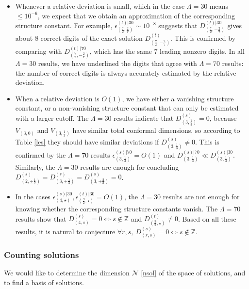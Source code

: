 \documentclass[12pt, a4paper]{article}
\begin{document}
\begin{itemize}
 \item
 Whenever a relative deviation is small, which in the case $\Lambda=30$ means $\leq 10^{-6}$, we expect that we obtain an approximation of the corresponding structure constant. For example, $\epsilon_{(\frac72,\frac27)}^{(t)|30}\sim 10^{-8}$ suggests that $D_{(\frac72,-\frac27)}^{(t)|30}$ gives about $8$ correct digits of the exact solution $D_{(\frac72,-\frac27)}^{(t)}$. This is confirmed by comparing with $D_{(\frac72,-\frac27)}^{(t)|70}$, which has the same $7$ leading nonzero digits. In all $\Lambda = 30$ results, we have underlined the digits that agree with $\Lambda = 70$ results: the number of correct digits is always accurately estimated by the relative deviation. 
 \item
 When a relative deviation is $O(1)$, we have either a vanishing structure constant, or a non-vanishing structure constant that can only be estimated with a larger cutoff. The $\Lambda =30$ results
 indicate that $D^{(s)}_{(3,\frac13)}=0$, because $V_{(3,0)}$ and $V_{(3,\frac13)}$ have similar total conformal dimensions, so according to Table \eqref{les} they should have similar deviations if $D^{(s)}_{(3,\frac13)}\neq 0$. This is confirmed by the $\Lambda = 70$ results $\epsilon_{(3,\frac13)}^{(s)|70} = O(1)$ and $D_{(3,\frac13)}^{(s)|70} \ll D_{(3,\frac13)}^{(s)|30}$.
 Similarly, the $\Lambda = 30$ results are enough for concluding $D^{(s)}_{(2,\pm\frac12)} =D^{(s)}_{(3,\pm \frac13)} = D^{(s)}_{(3,\pm \frac23)}=0$.
 \item
 In the cases $\epsilon^{(s)|30}_{(4,\star )},\epsilon^{(t)|30}_{(\frac92,\star)} = O(1)$, the $\Lambda =30$ results are not enough for knowing whether the corresponding structure constants vanish. The $\Lambda =70$ results show that $D^{(s)}_{(4,s)} = 0 \iff s \notin \mathbb{Z}$ and $D^{(t)}_{(\frac92,\star)} \neq 0$. Based on all these results, it is natural to conjecture $\forall r,s,\ D^{(s)}_{(r,s)} = 0 \iff s \notin \mathbb{Z}$.
\end{itemize}


\subsubsection{Counting solutions}

We would like to determine the dimension $\mathcal{N}$ \eqref{nsol} of the space of solutions, and to find a basis of solutions. 
\end{document}
